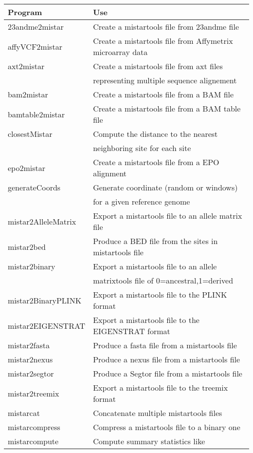 \documentclass[a4paper]{article}
\begin{document}
\noindent \begin{tabular}{|l|l|}
\hline
Program & Use \\
\hline
23andme2mistar & Create a mistartools file from 23andme file \\
affyVCF2mistar & Create a mistartools file from Affymetrix microarray data \\
axt2mistar &  Create a mistartools file from axt files \\
           & representing multiple sequence alignement  \\
bam2mistar &  Create a mistartools file from a BAM file \\
bamtable2mistar & Create a mistartools file from a BAM table file \\
closestMistar & Compute the distance to the nearest \\ 
              & neighboring site for each site \\
epo2mistar & Create a mistartools file from a EPO alignment \\
generateCoords & Generate coordinate (random or windows) \\
               & for a given reference genome \\
mistar2AlleleMatrix & Export a mistartools file to an allele matrix file \\
mistar2bed &  Produce a BED file from the sites in mistartools file \\
mistar2binary & Export a mistartools file to an allele \\
              & matrixtools file of 0=ancestral,1=derived \\
mistar2BinaryPLINK &  Export a mistartools file to the PLINK format \\
mistar2EIGENSTRAT & Export a mistartools file to the EIGENSTRAT format \\
mistar2fasta & Produce a fasta file from a mistartools file \\
mistar2nexus & Produce a nexus file from a mistartools file \\
mistar2segtor & Produce a Segtor file from a mistartools file \\
mistar2treemix & Export a mistartools file to the treemix format \\
mistarcat &  Concatenate multiple mistartools files \\
mistarcompress & Compress a mistartools file to a binary one \\
mistarcompute & Compute summary statistics like \\

\end{tabular}
\end{document}
